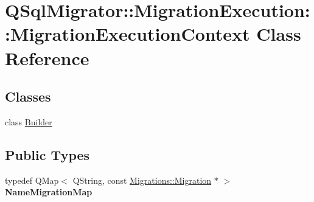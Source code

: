 \hypertarget{class_q_sql_migrator_1_1_migration_execution_1_1_migration_execution_context}{}\section{Q\+Sql\+Migrator\+:\+:Migration\+Execution\+:\+:Migration\+Execution\+Context Class Reference}
\label{class_q_sql_migrator_1_1_migration_execution_1_1_migration_execution_context}
\subsection*{Classes}
\begin{DoxyCompactItemize}
\item 
class \hyperlink{class_q_sql_migrator_1_1_migration_execution_1_1_migration_execution_context_1_1_builder}{Builder}
\end{DoxyCompactItemize}
\subsection*{Public Types}
\begin{DoxyCompactItemize}
\item 
\mbox{\label{class_q_sql_migrator_1_1_migration_execution_1_1_migration_execution_context_a0eab4f4416ff99846c69609935c9eaff}} 
typedef Q\+Map$<$ Q\+String, const \hyperlink{class_q_sql_migrator_1_1_migrations_1_1_migration}{Migrations\+::\+Migration} $\ast$ $>$ {\bfseries Name\+Migration\+Map}
\end{DoxyCompactItemize}
